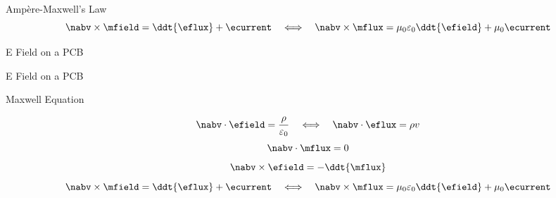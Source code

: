 \begin{frame}{Ampère-Maxwell's Law}
    \vspace{-10pt}
    \begin{equation}
        \nabv \times \mfield = \ddt{\eflux} + \ecurrent
        \hspace{1em} \Longleftrightarrow \hspace{1.0em}
        \nabv \times \mflux = \mu_0 \varepsilon_0 \ddt{\efield} + \mu_0 \ecurrent
    \end{equation}
\end{frame}

\begin{frame}{E Field on a PCB}
    \vspace{-20pt}
\end{frame}

\begin{frame}{E Field on a PCB}
    \vspace{-20pt}
\end{frame}

\begin{frame}{Maxwell Equation}
    \begin{twocolumns}[0.3]
    \leftcol
    \rightcol
        \vspace{-8pt}
        \begin{equation}
                \nabv \cdot \efield = \frac{\rho}{\varepsilon_0}
                \hspace{1em} \Longleftrightarrow \hspace{1.0em}
                \nabv \cdot \eflux = \rho v
        \end{equation}
        \vspace{-8pt}
        \begin{equation}
            \nabv \cdot \mflux = 0
        \end{equation}
        \vspace{-10pt}
        \begin{equation}
            \nabv \times \efield = -\ddt{\mflux}
        \end{equation}
        \vspace{-10pt}
        \begin{equation}
            \nabv \times \mfield = \ddt{\eflux} + \ecurrent
            \hspace{1em} \Longleftrightarrow \hspace{1.0em}
            \nabv \times \mflux = \mu_0 \varepsilon_0 \ddt{\efield} + \mu_0 \ecurrent
        \end{equation}
 \end{twocolumns}
\end{frame}

